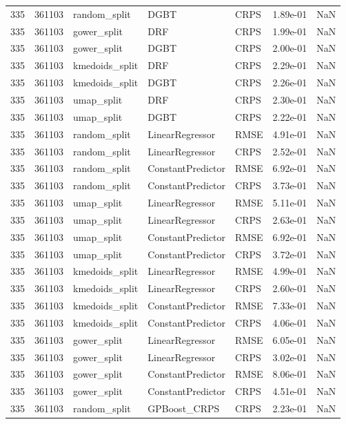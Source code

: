 \begin{tabular}{rrlllrr}
335 & 361103 & random\_split & DGBT & CRPS & 1.89e-01 & NaN \\
335 & 361103 & gower\_split & DRF & CRPS & 1.99e-01 & NaN \\
335 & 361103 & gower\_split & DGBT & CRPS & 2.00e-01 & NaN \\
335 & 361103 & kmedoids\_split & DRF & CRPS & 2.29e-01 & NaN \\
335 & 361103 & kmedoids\_split & DGBT & CRPS & 2.26e-01 & NaN \\
335 & 361103 & umap\_split & DRF & CRPS & 2.30e-01 & NaN \\
335 & 361103 & umap\_split & DGBT & CRPS & 2.22e-01 & NaN \\
335 & 361103 & random\_split & LinearRegressor & RMSE & 4.91e-01 & NaN \\
335 & 361103 & random\_split & LinearRegressor & CRPS & 2.52e-01 & NaN \\
335 & 361103 & random\_split & ConstantPredictor & RMSE & 6.92e-01 & NaN \\
335 & 361103 & random\_split & ConstantPredictor & CRPS & 3.73e-01 & NaN \\
335 & 361103 & umap\_split & LinearRegressor & RMSE & 5.11e-01 & NaN \\
335 & 361103 & umap\_split & LinearRegressor & CRPS & 2.63e-01 & NaN \\
335 & 361103 & umap\_split & ConstantPredictor & RMSE & 6.92e-01 & NaN \\
335 & 361103 & umap\_split & ConstantPredictor & CRPS & 3.72e-01 & NaN \\
335 & 361103 & kmedoids\_split & LinearRegressor & RMSE & 4.99e-01 & NaN \\
335 & 361103 & kmedoids\_split & LinearRegressor & CRPS & 2.60e-01 & NaN \\
335 & 361103 & kmedoids\_split & ConstantPredictor & RMSE & 7.33e-01 & NaN \\
335 & 361103 & kmedoids\_split & ConstantPredictor & CRPS & 4.06e-01 & NaN \\
335 & 361103 & gower\_split & LinearRegressor & RMSE & 6.05e-01 & NaN \\
335 & 361103 & gower\_split & LinearRegressor & CRPS & 3.02e-01 & NaN \\
335 & 361103 & gower\_split & ConstantPredictor & RMSE & 8.06e-01 & NaN \\
335 & 361103 & gower\_split & ConstantPredictor & CRPS & 4.51e-01 & NaN \\
335 & 361103 & random\_split & GPBoost\_CRPS & CRPS & 2.23e-01 & NaN \\

\end{tabular}
